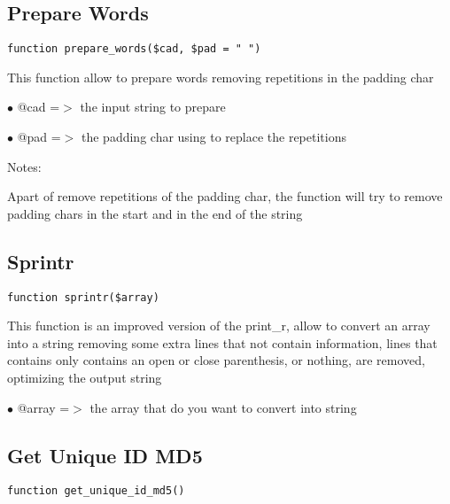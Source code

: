 \documentclass[a4paper]{book}
\begin{document}
\hypertarget{toc268}{}
\subsection{Prepare Words}

\begin{lstlisting}
function prepare_words($cad, $pad = " ")
\end{lstlisting}

This function allow to prepare words removing repetitions in the padding char

\begin{compactitem}
\item[\color{myblue}$\bullet$] @cad =$>$ the input string to prepare
\item[\color{myblue}$\bullet$] @pad =$>$ the padding char using to replace the repetitions
\end{compactitem}

Notes:

Apart of remove repetitions of the padding char, the function will try to
remove padding chars in the start and in the end of the string

\hypertarget{toc269}{}
\subsection{Sprintr}

\begin{lstlisting}
function sprintr($array)
\end{lstlisting}

This function is an improved version of the print\_r, allow to convert an
array into a string removing some extra lines that not contain information,
lines that contains only contains an open or close parenthesis, or nothing,
are removed, optimizing the output string

\begin{compactitem}
\item[\color{myblue}$\bullet$] @array =$>$ the array that do you want to convert into string
\end{compactitem}

\hypertarget{toc270}{}
\subsection{Get Unique ID MD5}

\begin{lstlisting}
function get_unique_id_md5()
\end{lstlisting}
\end{document}
